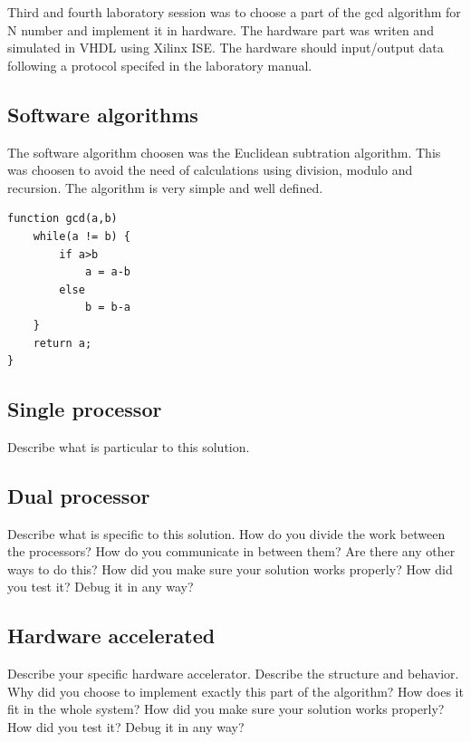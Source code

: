 \documentclass[11pt]{article}
\begin{document}
Third and fourth  laboratory session was to choose a part of the gcd algorithm for N number and implement it in hardware. The hardware part was writen and simulated in VHDL using Xilinx ISE.  The hardware should input/output data following a protocol specifed in the laboratory manual.

\subsection{Software algorithms}
The software algorithm choosen was the Euclidean subtration algorithm. This was choosen to avoid the need of calculations using division, modulo and recursion. The algorithm is very simple and well defined. 
\begin{lstlisting}[float=tbh,frame=tb,captionpos=b,caption={Working on your report},label=lst:example]
function gcd(a,b)
	while(a != b) {
		if a>b
			a = a-b
		else
			b = b-a
	}
	return a;
}
\end{lstlisting}

\subsection{Single processor}
Describe what is particular to this solution.
\subsection{Dual processor}
Describe what is specific to this solution. How do you divide the work between the processors? How do you communicate in between them? Are there any other ways to do this? How did you make sure your solution works properly? How did you test it? Debug it in any way?
\subsection{Hardware accelerated}
Describe your specific hardware accelerator. Describe the structure and behavior. Why did you choose to implement exactly this part of the algorithm? How does it fit in the whole system? How did you make sure your solution works properly? How did you test it? Debug it in any way?
\end{document}
